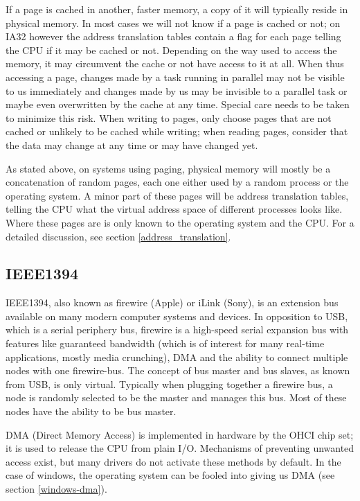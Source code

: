 If a page is cached in another, faster memory, a copy of it will typically
reside in physical memory. In most cases we will not know if a page is cached or
not; on IA32 however the address translation tables contain a flag for each page
telling the CPU if it may be cached or not. Depending on the way used to access
the memory, it may circumvent the cache or not have access to it at all.  When
thus accessing a page, changes made by a task running in parallel may not be
visible to us immediately and changes made by us may be invisible to a parallel
task or maybe even overwritten by the cache at any time. Special care needs to
be taken to minimize this risk. When writing to pages, only choose pages that
are not cached or unlikely to be cached while writing; when reading pages,
consider that the data may change at any time or may have changed yet.

As stated above, on systems using paging, physical memory will mostly be a
concatenation of random pages, each one either used by a random process or the
operating system. A minor part of these pages will be address translation
tables, telling the CPU what the virtual address space of different processes
looks like. Where these pages are is only known to the operating system and the
CPU.  For a detailed discussion, see section \ref{address_translation}.



\subsection{IEEE1394}

IEEE1394, also known as \epsfysize 0.3cm 
firewire (Apple) or iLink (Sony), is an extension bus available on many modern
computer systems and devices.  In opposition to USB, which is a serial periphery
bus, firewire is a high-speed serial expansion bus with features like guaranteed
bandwidth (which is of interest for many real-time applications, mostly media
crunching), DMA and the ability to connect multiple nodes with one firewire-bus.
The concept of bus master and bus slaves, as known from USB, is only virtual.
Typically when plugging together a firewire bus, a node is randomly selected to
be the master and manages this bus. Most of these nodes have the ability to be
bus master.

DMA (Direct Memory Access) is implemented in hardware by the OHCI chip set; it
is used to release the CPU from plain I/O. Mechanisms of preventing unwanted
access exist, but many drivers do not activate these methods by default. In the
case of windows, the operating system can be fooled into giving us DMA (see
section \ref{windows-dma}).

